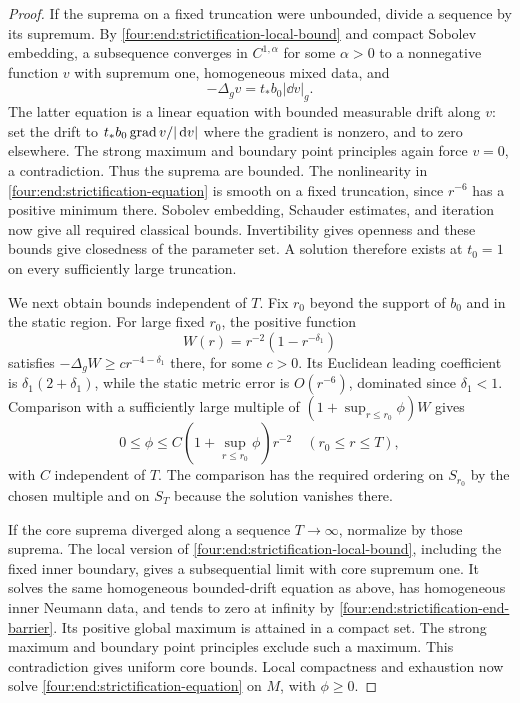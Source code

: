 \begin{proof}
If the suprema on a fixed truncation were unbounded, divide a sequence
by its supremum. By \eqref{four:end:strictification-local-bound} and compact
Sobolev embedding, a subsequence converges in \(C^{1,\alpha}\) for
some \(\alpha>0\) to a nonnegative function \(v\) with supremum one,
homogeneous mixed data, and
\[
 -\Delta_gv=t_*b_0|\dd v|_g.
\]
The latter equation is a linear equation with bounded measurable drift
along \(v\): set the drift to
\(t_*b_0\operatorname{grad} v/|\,\mathrm d v|\) where the gradient is nonzero, and to zero
elsewhere. The strong maximum and boundary point principles again
force \(v=0\), a contradiction. Thus the suprema are bounded.
The nonlinearity in \eqref{four:end:strictification-equation} is smooth on
a fixed truncation, since \(r^{-6}\) has a positive minimum there.
Sobolev embedding, Schauder estimates, and iteration now give all
required classical bounds. Invertibility gives openness and these
bounds give closedness of the parameter set. A solution therefore
exists at \(t_0=1\) on every sufficiently large truncation.

We next obtain bounds independent of \(T\). Fix \(r_0\) beyond the
support of \(b_0\) and in the static region. For large fixed \(r_0\),
the positive function
\[
 W(r)=r^{-2}(1-r^{-\delta_1})
\]
satisfies \(-\Delta_gW\ge c r^{-4-\delta_1}\) there, for some
\(c>0\). Its Euclidean leading coefficient is
\(\delta_1(2+\delta_1)\), while the static metric error is
\(O(r^{-6})\), dominated since \(\delta_1<1\).
Comparison with a sufficiently large multiple of
\((1+\sup_{r\le r_0}\phi)W\) gives
\begin{equation}\label{four:end:strictification-end-barrier}
 0\le\phi\le C(1+\sup_{r\le r_0}\phi)r^{-2}
       \quad(r_0\le r\le T),
\end{equation}
with \(C\) independent of \(T\). The comparison has the required
ordering on \(S_{r_0}\) by the chosen multiple and on \(S_T\) because
the solution vanishes there.

If the core suprema diverged along a sequence \(T\to\infty\), normalize
by those suprema. The local version of
\eqref{four:end:strictification-local-bound}, including the fixed inner
boundary, gives a subsequential limit with core supremum one. It solves
the same homogeneous bounded-drift equation as above, has homogeneous
inner Neumann data, and tends to zero at infinity by
\eqref{four:end:strictification-end-barrier}. Its positive global maximum
is attained in a compact set. The strong maximum and boundary point
principles exclude such a maximum. This contradiction gives uniform
core bounds. Local compactness and exhaustion now solve
\eqref{four:end:strictification-equation} on \(M\), with \(\phi\ge0\).


\end{proof}
